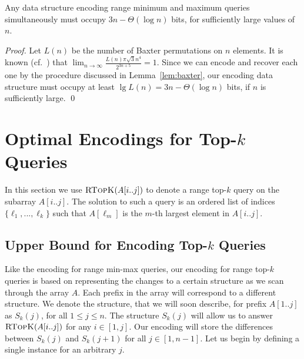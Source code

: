 \documentclass[runningheads]{llncs}
\newcommand{\rtopk}{\textsc{RTopK}}
\begin{document}
\begin{theorem}\label{thm:min-max-lb}
Any data structure encoding range minimum and maximum queries
simultaneously must occupy $3n - \Theta(\log n)$ bits, for
sufficiently large values of $n$.
\end{theorem}

\begin{proof}
Let $L(n)$ be the number of Baxter permutations on $n$ elements.  It
is known (cf.~\cite{OEIS}) that $\lim_{n \to \infty} \frac{L(n)
  \pi\sqrt{3}n^4}{2^{3n+5}} = 1$. Since we can encode and recover each
one by the procedure discussed in Lemma~\ref{lem:baxter}, our encoding
data structure must occupy at least $\lg L(n) = 3n-\Theta(\log n)$
bits, if $n$ is sufficiently large. \qed
\end{proof}

\section{Optimal Encodings for Top-\texorpdfstring{$k$}{k} Queries\label{sec:top-k}}

In this section we use $\rtopk(A[i..j])$ to denote a range
top-$k$ query on the subarray $A[i..j]$.  The solution to such a query
is an ordered list of indices $\{\ell_1, ..., \ell_k\}$ such that
$A[\ell_m]$ is the $m$-th largest element in $A[i..j]$.

\subsection{Upper Bound for Encoding Top-\texorpdfstring{$k$}{k} Queries\label{sec:encoding-topk}}

Like the encoding for range min-max queries, our encoding for range
top-$k$ queries is based on representing the changes to a certain
structure as we scan through the array $A$.  Each prefix in the array
will correspond to a different structure. We denote the structure,
that we will soon describe, for prefix $A[1..j]$ as $S_k(j)$, for all
$1 \le j \le n$. The structure $S_k(j)$ will allow us to answer
$\rtopk(A[i..j])$ for any $i \in [1,j]$. Our encoding will store the
differences between $S_k(j)$ and $S_k(j+1)$ for all $j \in [1,n-1]$.
Let us begin by defining a single instance for an arbitrary $j$.
\end{document}
